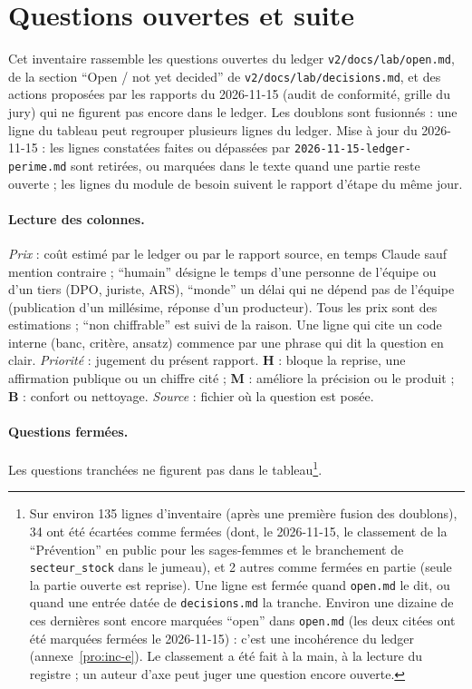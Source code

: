 \begingroup\sloppy
\section{Questions ouvertes et suite}\label{sec:ouvertes-ref}\label{ouv:sec}

Cet inventaire rassemble les questions ouvertes du ledger \texttt{v2/\allowbreak{}docs/\allowbreak{}lab/\allowbreak{}open.md}, de la section \enquote{Open / not yet decided} de \texttt{v2/\allowbreak{}docs/\allowbreak{}lab/\allowbreak{}decisions.md}, et des actions proposées par les rapports du 2026-11-15 (audit de conformité, grille du jury) qui ne figurent pas encore dans le ledger.
Les doublons sont fusionnés : une ligne du tableau peut regrouper plusieurs lignes du ledger. Mise à jour du 2026-11-15 : les lignes constatées faites ou dépassées par \texttt{2026-\allowbreak{}11-\allowbreak{}15-\allowbreak{}ledger-\allowbreak{}perime.md} sont retirées, ou marquées dans le texte quand une partie reste ouverte ; les lignes du module de besoin suivent le rapport d'étape du même jour.

\paragraph{Lecture des colonnes.}
\emph{Prix} : coût estimé par le ledger ou par le rapport source, en temps Claude sauf mention contraire ; \enquote{humain} désigne le temps d'une personne de l'équipe ou d'un tiers (DPO, juriste, ARS), \enquote{monde} un délai qui ne dépend pas de l'équipe (publication d'un millésime, réponse d'un producteur). Tous les prix sont des estimations\suppose{} ; \enquote{non chiffrable} est suivi de la raison.
Une ligne qui cite un code interne (banc, critère, ansatz) commence par une phrase qui dit la question en clair.
\emph{Priorité} : jugement du présent rapport. \textbf{H} : bloque la reprise, une affirmation publique ou un chiffre cité ; \textbf{M} : améliore la précision ou le produit ; \textbf{B} : confort ou nettoyage.
\emph{Source} : fichier où la question est posée.

\paragraph{Questions fermées.}
Les questions tranchées ne figurent pas dans le tableau\footnote{Sur environ 135\derive{} lignes d'inventaire (après une première fusion des doublons), 34\derive{} ont été écartées comme fermées (dont, le 2026-11-15, le classement de la \enquote{Prévention} en public pour les sages-femmes et le branchement de \texttt{secteur\_\allowbreak{}stock} dans le jumeau), et 2\derive{} autres comme fermées en partie (seule la partie ouverte est reprise). Une ligne est fermée quand \texttt{open.md} le dit, ou quand une entrée datée de \texttt{decisions.md} la tranche. Environ une dizaine\derive{} de ces dernières sont encore marquées \enquote{open} dans \texttt{open.md} (les deux citées ont été marquées fermées le 2026-11-15) : c'est une incohérence du ledger (annexe~\ref{pro:inc-e}). Le classement a été fait à la main, à la lecture du registre ; un auteur d'axe peut juger une question encore ouverte.}.


